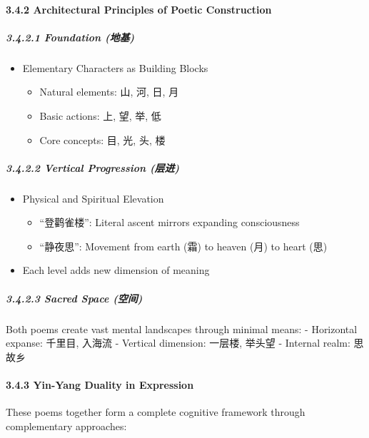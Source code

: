 \documentclass[
  11pt,
  letterpaper,
]{article}
\providecommand{\tightlist}{%
  \setlength{\itemsep}{0pt}\setlength{\parskip}{0pt}}
\begin{document}
\paragraph{3.4.2 Architectural Principles of Poetic
Construction}\label{architectural-principles-of-poetic-construction}

\subparagraph{3.4.2.1 Foundation (地基)}\label{foundation-ux5730ux57fa}

\begin{itemize}
\tightlist
\item
  Elementary Characters as Building Blocks

  \begin{itemize}
  \tightlist
  \item
    Natural elements: 山, 河, 日, 月
  \item
    Basic actions: 上, 望, 举, 低
  \item
    Core concepts: 目, 光, 头, 楼
  \end{itemize}
\end{itemize}

\subparagraph{3.4.2.2 Vertical Progression
(层进)}\label{vertical-progression-ux5c42ux8fdb}

\begin{itemize}
\tightlist
\item
  Physical and Spiritual Elevation

  \begin{itemize}
  \tightlist
  \item
    ``登鹳雀楼'': Literal ascent mirrors expanding consciousness
  \item
    ``静夜思'': Movement from earth (霜) to heaven (月) to heart (思)
  \end{itemize}
\item
  Each level adds new dimension of meaning
\end{itemize}

\subparagraph{3.4.2.3 Sacred Space
(空间)}\label{sacred-space-ux7a7aux95f4}

Both poems create vast mental landscapes through minimal means: -
Horizontal expanse: 千里目, 入海流 - Vertical dimension: 一层楼, 举头望
- Internal realm: 思故乡

\paragraph{3.4.3 Yin-Yang Duality in
Expression}\label{yin-yang-duality-in-expression}

These poems together form a complete cognitive framework through
complementary approaches:
\end{document}
